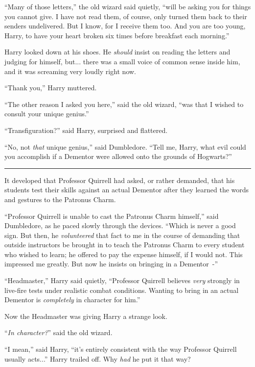 ``Many of those letters,'' the old wizard said quietly, ``will be asking you for things you cannot give. I have not read them, of course, only turned them back to their senders undelivered. But I know, for I receive them too. And you are too young, Harry, to have your heart broken six times before breakfast each morning.''

Harry looked down at his shoes. He \emph{should} insist on reading the letters and judging for himself, but... there was a small voice of common sense inside him, and it was screaming very loudly right now.

``Thank you,'' Harry muttered.

``The other reason I asked you here,'' said the old wizard, ``was that I wished to consult your unique genius.''

``Transfiguration?'' said Harry, surprised and flattered.

``No, not \emph{that} unique genius,'' said Dumbledore. ``Tell me, Harry, what evil could you accomplish if a Dementor were allowed onto the grounds of Hogwarts?''

\begin{center}\rule{3in}{0.4pt}\end{center}

It developed that Professor Quirrell had asked, or rather demanded, that his students test their skills against an actual Dementor after they learned the words and gestures to the Patronus Charm.

``Professor Quirrell is unable to cast the Patronus Charm himself,'' said Dumbledore, as he paced slowly through the devices. ``Which is never a good sign. But then, he \emph{volunteered} that fact to me in the course of demanding that outside instructors be brought in to teach the Patronus Charm to every student who wished to learn; he offered to pay the expense himself, if I would not. This impressed me greatly. But now he insists on bringing in a Dementor~-''

``Headmaster,'' Harry said quietly, ``Professor Quirrell believes \emph{very} strongly in live-fire tests under realistic combat conditions. Wanting to bring in an actual Dementor is \emph{completely} in character for him.''

Now the Headmaster was giving Harry a strange look.

``\emph{In character?}'' said the old wizard.

``I mean,'' said Harry, ``it's entirely consistent with the way Professor Quirrell usually acts...'' Harry trailed off. Why \emph{had} he put it that way?

